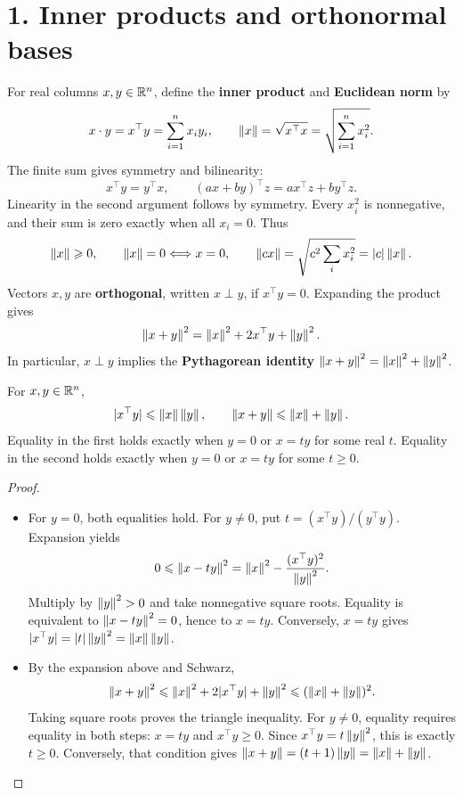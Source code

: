 \section*{1. Inner products and orthonormal bases}

For real columns \(x,y\in\mathbb R^n\), define the
\textbf{inner product} and \textbf{Euclidean norm} by
\[
x\cdot y=x^\top y=\sum_{i=1}^n x_i y_i,\qquad
\left\lVert x\right\rVert=\sqrt{x^\top x}=\sqrt{\sum_{i=1}^n x_i^2}.
\]
The finite sum gives symmetry and bilinearity:
\[
x^\top y=y^\top x,\qquad
(ax+by)^\top z=a x^\top z+b y^\top z.
\]
Linearity in the second argument follows by symmetry. Every \(x_i^2\)
is nonnegative, and their sum is zero exactly when all \(x_i=0\). Thus
\[
\left\lVert x\right\rVert\geqslant0,\qquad \left\lVert x\right\rVert=0\Longleftrightarrow x=0,\qquad
\left\lVert cx\right\rVert=\sqrt{c^2\sum_i x_i^2}=|c|\left\lVert x\right\rVert.
\]
Vectors \(x,y\) are \textbf{orthogonal}, written \(x\perp y\), if
\(x^\top y=0\). Expanding the product gives
\[
\left\lVert x+y\right\rVert^2=\left\lVert x\right\rVert^2+2x^\top y+\left\lVert y\right\rVert^2.
\]
In particular, \(x\perp y\) implies the \textbf{Pythagorean identity}
\(\left\lVert x+y\right\rVert^2=\left\lVert x\right\rVert^2+\left\lVert y\right\rVert^2\).

\begin{theorem}\label{thm:06:schwarz}
For \(x,y\in\mathbb R^n\),
\[
|x^\top y|\leqslant\left\lVert x\right\rVert\left\lVert y\right\rVert,\qquad
\left\lVert x+y\right\rVert\leqslant\left\lVert x\right\rVert+\left\lVert y\right\rVert.
\]
Equality in the first holds exactly when \(y=0\) or \(x=ty\) for
some real \(t\). Equality in the second holds exactly when \(y=0\)
or \(x=ty\) for some \(t\geqslant0\).
\end{theorem}
\begin{proof}
\begin{itemize}
\item For \(y=0\), both equalities hold. For \(y\ne0\), put
  \(t=(x^\top y)/(y^\top y)\). Expansion yields
  \[
  0\leqslant\left\lVert x-ty\right\rVert^2
  =\left\lVert x\right\rVert^2-\frac{(x^\top y)^2}{\left\lVert y\right\rVert^2}.
  \]
  Multiply by \(\left\lVert y\right\rVert^2>0\) and take nonnegative square roots.
  Equality is equivalent to \(\left\lVert x-ty\right\rVert^2=0\), hence to \(x=ty\).
  Conversely, \(x=ty\) gives \(|x^\top y|=|t|\left\lVert y\right\rVert^2
  =\left\lVert x\right\rVert\left\lVert y\right\rVert\).
\item By the expansion above and Schwarz,
  \[
  \left\lVert x+y\right\rVert^2
  \leqslant\left\lVert x\right\rVert^2+2|x^\top y|+\left\lVert y\right\rVert^2
  \leqslant(\left\lVert x\right\rVert+\left\lVert y\right\rVert)^2.
  \]
  Taking square roots proves the triangle inequality.
  For \(y\ne0\), equality requires equality in both steps:
  \(x=ty\) and \(x^\top y\geqslant0\). Since
  \(x^\top y=t\left\lVert y\right\rVert^2\), this is exactly \(t\geqslant0\).
  Conversely, that condition gives
  \(\left\lVert x+y\right\rVert=(t+1)\left\lVert y\right\rVert=\left\lVert x\right\rVert+\left\lVert y\right\rVert\).
\end{itemize}
\end{proof}

